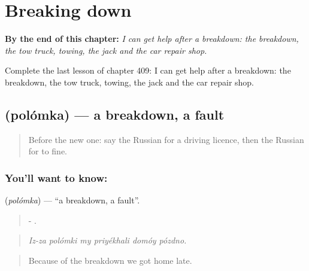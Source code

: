 
\chapter{Breaking down}
\label{ch:ru-breaking-down}

\begin{chapteropening}
\textbf{By the end of this chapter:} \emph{I can get help after a breakdown: the breakdown, the tow truck, towing, the jack and the car repair shop.}

Complete the last lesson of chapter 409: I can get help after a breakdown: the breakdown, the tow truck, towing, the jack and the car repair shop.
\end{chapteropening}

\section[\texorpdfstring{\ru{поломка} (polómka)}{поломка (polómka)}]{ (polómka) — a breakdown, a fault}

\label{lesson:RU-C409-polomka}



\begin{quote}
Before the new one: say the Russian for a driving licence, then the Russian for to fine.
\end{quote}

\subsection*{You'll want to know: }
\textbf{} (\emph{polómka}) — \textquotedblleft{}a breakdown, a fault\textquotedblright{}.

\begin{quote}
-     .
\end{quote}

\begin{quote}
\emph{Iz-za polómki my priyékhali domóy pózdno.}
\end{quote}

\begin{quote}
Because of the breakdown we got home late.
\end{quote}

